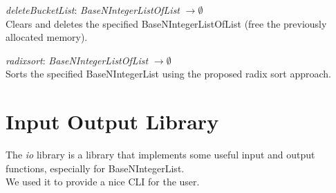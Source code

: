 \documentclass[book, backcover, english, nodocumentinfo]{upmethodology-document}
\begin{document}
		\begin{minipage}{\linewidth}
			\textit{deleteBucketList}: \textit{BaseNIntegerListOfList} $\rightarrow \emptyset$\\
			Clears and deletes the specified BaseNIntegerListOfList (free the previously allocated memory).
			\label{algo:BNIL-DeleteBucketList}
			
		\end{minipage}
		\nxtalgo{}

		\begin{minipage}{\linewidth}
			\textit{radixsort}: \textit{BaseNIntegerListOfList} $\rightarrow \emptyset$\\
			Sorts the specified BaseNIntegerList using the proposed radix sort approach.
			\label{algo:BNIL-RadixSort}
			
		\end{minipage}
		\nxtalgo{}

\chapter{Input Output Library} \label{chapter:IO-Lib}
	The \textit{io} library is a library that implements some useful input and output functions, especially for BaseNIntegerList.\\
	We used it to provide a nice CLI for the user.\\
\end{document}
